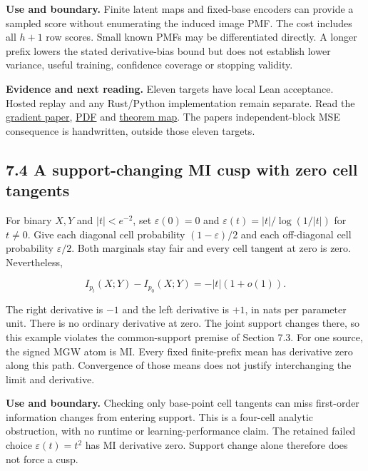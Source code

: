 \documentclass[
  11pt,
  a4paper,
]{article}
\begin{document}
\textbf{Use and boundary.} Finite latent maps and fixed-base encoders
can provide a sampled score without enumerating the induced image PMF.
The cost includes all \(h+1\) row scores. Small known PMFs may be
differentiated directly. A longer prefix lowers the stated
derivative-bias bound but does not establish lower variance, useful
training, confidence coverage or stopping validity.

\textbf{Evidence and next reading.} Eleven targets have local Lean
acceptance. Hosted replay and any Rust/Python implementation remain
separate. Read the
\href{https://github.com/sepahead/pid-rs/blob/main/audit/research/finite-prefix-mgw-gradient/EXPOSITION.md}{gradient
paper},
\href{https://github.com/sepahead/pid-rs/blob/main/output/pdf/finite-prefix-mgw-gradient.pdf}{PDF}
and
\href{https://github.com/sepahead/pid-rs/blob/main/audit/formal/lean-prefix-mgw-gradient/THEOREM_MAP.md}{theorem
map}. The paper\textquotesingle s independent-block MSE consequence is
handwritten, outside those eleven targets.


\subsection{7.4 A support-changing MI cusp with zero cell
tangents}\label{74-a-support-changing-mi-cusp-with-zero-cell-tangents}

For binary \(X,Y\) and \(|t|<e^{-2}\), set \(\varepsilon(0)=0\) and
\(\varepsilon(t)=|t|/\log(1/|t|)\) for \(t\ne0\). Give each diagonal
cell probability \((1-\varepsilon)/2\) and each off-diagonal cell
probability \(\varepsilon/2\). Both marginals stay fair and every cell
tangent at zero is zero. Nevertheless,

\[
I_{p_t}(X;Y)-I_{p_0}(X;Y)=-|t|(1+o(1)).
\]

The right derivative is \(-1\) and the left derivative is \(+1\), in
nats per parameter unit. There is no ordinary derivative at zero. The
joint support changes there, so this example violates the common-support
premise of Section 7.3. For one source, the signed MGW atom is MI. Every
fixed finite-prefix mean has derivative zero along this path.
Convergence of those means does not justify interchanging the limit and
derivative.

\textbf{Use and boundary.} Checking only base-point cell tangents can
miss first-order information changes from entering support. This is a
four-cell analytic obstruction, with no runtime or learning-performance
claim. The retained failed choice \(\varepsilon(t)=t^2\) has MI
derivative zero. Support change alone therefore does not force a cusp.
\end{document}
